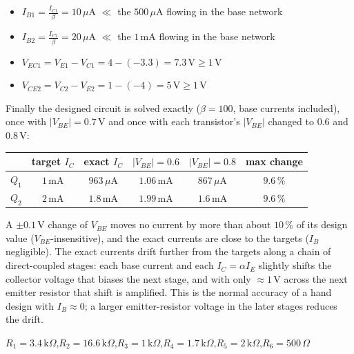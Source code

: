 \documentclass[11pt]{article}
\newcommand{\solstep}[2]{\par\medskip{\color{stepc}\textbf{Step #1 --- #2}}\par\nopagebreak}
\begin{document}
\solstep{4}{Check the design}\begin{itemize}[leftmargin=*,itemsep=2pt]
\item $I_{B1} = \frac{I_{C1}}{\beta} = 10\,\mu \mathrm{A}$ $\ll$ the $500\,\mu \mathrm{A}$ flowing in the base network \checkmark
\item $I_{B2} = \frac{I_{C2}}{\beta} = 20\,\mu \mathrm{A}$ $\ll$ the $1\,\mathrm{m}\mathrm{A}$ flowing in the base network \checkmark
\item $V_{EC1} = V_{E1} - V_{C1} = 4 - (-3.3) = 7.3\,\mathrm{V} \ge 1$\,V \checkmark
\item $V_{CE2} = V_{C2} - V_{E2} = 1 - (-4) = 5\,\mathrm{V} \ge 1$\,V \checkmark
\end{itemize}
Finally the designed circuit is solved exactly ($\beta=100$, base currents included), once with $|V_{BE}|=0.7$\,V and once with each transistor's $|V_{BE}|$ changed to $0.6$ and $0.8$\,V:\begin{center}\renewcommand{\arraystretch}{1.35}
\begin{tabular}{cccccc}
\toprule
 & target $I_C$ & exact $I_C$ & $|V_{BE}|=0.6$ & $|V_{BE}|=0.8$ & max change \\
\midrule
$Q_{1}$ & $1\,\mathrm{m}\mathrm{A}$ & $963\,\mu \mathrm{A}$ & $1.06\,\mathrm{m}\mathrm{A}$ & $867\,\mu \mathrm{A}$ & $9.6\,\%$ \\
$Q_{2}$ & $2\,\mathrm{m}\mathrm{A}$ & $1.8\,\mathrm{m}\mathrm{A}$ & $1.99\,\mathrm{m}\mathrm{A}$ & $1.6\,\mathrm{m}\mathrm{A}$ & $9.6\,\%$ \\
\bottomrule
\end{tabular}\end{center}
A $\pm0.1$\,V change of $V_{BE}$ moves no current by more than about $10\,\%$ of its design value ($V_{BE}$-insensitive), and the exact currents are close to the targets ($I_B$ negligible). The exact currents drift further from the targets along a chain of direct-coupled stages: each base current and each $I_C = \alpha I_E$ slightly shifts the collector voltage that biases the next stage, and with only $\approx1$\,V across the next emitter resistor that shift is amplified. This is the normal accuracy of a hand design with $I_B\approx0$; a larger emitter-resistor voltage in the later stages reduces the drift.
\begin{ansbox}
$R_{1} = 3.4\,\mathrm{k}\Omega$,\quad $R_{2} = 16.6\,\mathrm{k}\Omega$,\quad $R_{3} = 1\,\mathrm{k}\Omega$,\quad $R_{4} = 1.7\,\mathrm{k}\Omega$,\quad $R_{5} = 2\,\mathrm{k}\Omega$,\quad $R_{6} = 500\,\Omega$
\end{ansbox}
\end{document}
